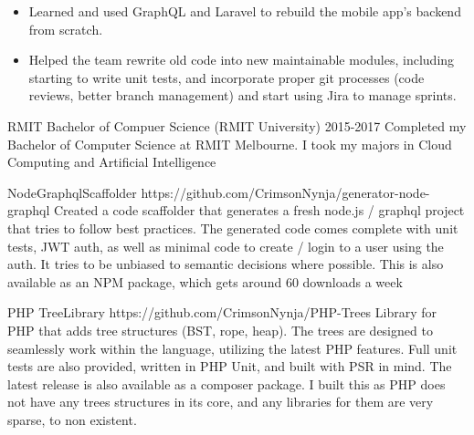 \documentclass[8pt]{developercv}
\begin{document}
\begin{minipage}[t]{0.7\textwidth}
\begin{entrylist}
{\begin{itemize}
					\item Learned and used GraphQL and Laravel to rebuild the mobile app's backend from scratch.
					\item Helped the team rewrite old code into new maintainable modules, including starting to write unit tests, and incorporate proper git processes (code reviews, better branch management) and start using Jira to manage sprints.
				\end{itemize}
				}
		\end{entrylist}			
		\begin{entrylist}	%
			\entry
				{RMIT}
				{Bachelor of Compuer Science (RMIT University)}
				{2015-2017}
				{Completed my Bachelor of Computer Science at RMIT Melbourne. I took my majors in Cloud Computing and Artificial Intelligence }
		\end{entrylist}
		\begin{entrylist}	%
			\entry
				{Node\newline Graphql\newline Scaffolder}
				{https://github.com/CrimsonNynja/generator-node-graphql}
				{}
				{Created a code scaffolder that generates a fresh node.js / graphql project that tries to follow best practices. The generated code comes complete with unit tests, JWT auth, as well as minimal code to create / login to a user using the auth. It tries to be unbiased to semantic decisions where possible. This is also available as an NPM package, which gets around 60 downloads a week}
		\end{entrylist}
		\begin{entrylist}	%
			\entry
				{PHP Tree\newline Library}
				{https://github.com/CrimsonNynja/PHP-Trees}
				{}
				{Library for PHP that adds tree structures (BST, rope, heap). The trees are designed to seamlessly work within the language, utilizing the latest PHP features. Full unit tests are also provided, written in PHP Unit, and built with PSR in mind. The latest release is also available as a composer package. I built this as PHP does not have any trees structures in its core, and any libraries for them are very sparse, to non existent. }
		\end{entrylist}
	\end{minipage}
\begin{minipage}[t]{0.05\textwidth}
\hphantom{0.1}
\end{minipage}
\end{document}
